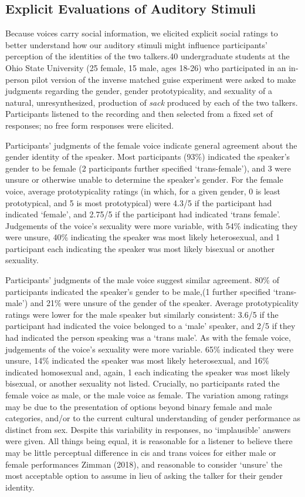 \documentclass[
  letterpaper,
  DIV=11,
  numbers=noendperiod]{scrartcl}
\begin{document}
\subsection{Explicit Evaluations of Auditory
Stimuli}\label{explicit-evaluations-of-auditory-stimuli}

Because voices carry social information, we elicited explicit social
ratings to better understand how our auditory stimuli might influence
participants' perception of the identities of the two talkers.40
undergraduate students at the Ohio State University (25 female, 15 male,
ages 18-26) who participated in an in-person pilot version of the
inverse matched guise experiment were asked to make judgments regarding
the gender, gender prototypicality, and sexuality of a natural,
unresynthesized, production of \emph{sack} produced by each of the two
talkers. Participants listened to the recording and then selected from a
fixed set of responses; no free form responses were elicited.

Participants' judgments of the female voice indicate general agreement
about the gender identity of the speaker. Most participants (93\%)
indicated the speaker's gender to be female (2 participants further
specified `trans-female'), and 3 were unsure or otherwise unable to
determine the speaker's gender. For the female voice, average
prototypicality ratings (in which, for a given gender, 0 is least
prototypical, and 5 is most prototypical) were 4.3/5 if the participant
had indicated `female', and 2.75/5 if the participant had indicated
`trans female'. Judgements of the voice's sexuality were more variable,
with 54\% indicating they were unsure, 40\% indicating the speaker was
most likely heterosexual, and 1 participant each indicating the speaker
was most likely bisexual or another sexuality.

Participants' judgments of the male voice suggest similar agreement.
80\% of participants indicated the speaker's gender to be male,(1
further specified `trans-male') and 21\% were unsure of the gender of
the speaker. Average prototypicality ratings were lower for the male
speaker but similarly consistent: 3.6/5 if the participant had indicated
the voice belonged to a `male' speaker, and 2/5 if they had indicated
the person speaking was a `trans male'. As with the female voice,
judgements of the voice's sexuality were more variable. 65\% indicated
they were unsure, 14\% indicated the speaker was most likely
heterosexual, and 16\% indicated homosexual and, again, 1 each
indicating the speaker was most likely bisexual, or another sexuality
not listed. Crucially, no participants rated the female voice as male,
or the male voice as female. The variation among ratings may be due to
the presentation of options beyond binary female and male categories,
and/or to the current cultural understanding of gender performance as
distinct from sex. Despite this variability in responses, no
`implausible' answers were given. All things being equal, it is
reasonable for a listener to believe there may be little perceptual
difference in cis and trans voices for either male or female
performances Zimman (2018), and reasonable to consider `unsure' the most
acceptable option to assume in lieu of asking the talker for their
gender identity.
\end{document}
